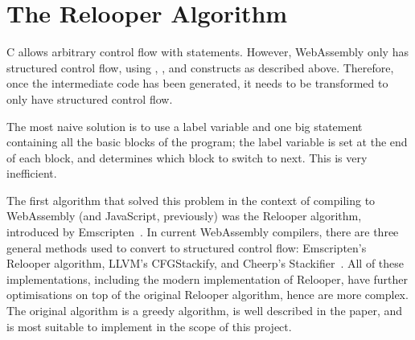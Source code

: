 \documentclass[00-main.tex]{subfiles}
\begin{document}




\section{The Relooper Algorithm}\label{sec:prep:relooper}

C allows arbitrary control flow with  statements.
However, WebAssembly only has structured control flow, using , , and  constructs as described above.
Therefore, once the intermediate code has been generated, it needs to be transformed to only have structured control flow.

The most naive solution is to use a label variable and one big  statement containing all the basic blocks of the program; the label variable is set at the end of each block, and determines which block to switch to next.
This is very inefficient.

The first algorithm that solved this problem in the context of compiling to WebAssembly (and JavaScript, previously) was the Relooper algorithm, introduced by Emscripten~.
In current Web\-Assembly compilers, there are three general methods used to convert to structured control flow: Emscripten's Relooper algorithm, LLVM's CFGStackify, and Cheerp's Stackifier~.
All of these implementations, including the modern implementation of Relooper, have further optimisations on top of the original Relooper algorithm, hence are more complex.
The original algorithm is a greedy algorithm, is well described in the paper, and is most suitable to implement in the scope of this project.
\end{document}
